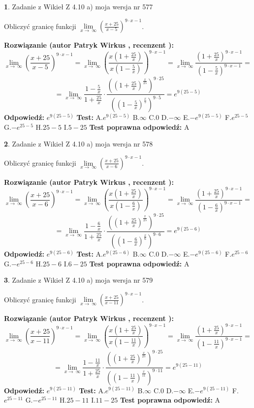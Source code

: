 \documentclass[12pt, a4paper]{article}
\theoremstyle{definition} %
\newtheorem{zad}{}
\newcommand{\zadStart}[1]{\begin{zad}#1\newline}
\newcommand{\zadStop}{\end{zad}}
\newcommand{\rozwStart}[2]{\noindent \textbf{Rozwiązanie (autor #1 , recenzent #2): }\newline}
\newcommand{\rozwStop}{\newline}
\newcommand{\odpStart}{\noindent \textbf{Odpowiedź:}\newline}
\newcommand{\odpStop}{\newline}
\newcommand{\testStart}{\noindent \textbf{Test:}\newline}
\newcommand{\testStop}{\newline}
\newcommand{\kluczStart}{\noindent \textbf{Test poprawna odpowiedź:}\newline}
\newcommand{\kluczStop}{\newline}
\begin{document}
\zadStart{Zadanie z Wikieł Z 4.10 a) moja wersja nr 577}


Obliczyć granicę funkcji  $\lim\limits_{x\to\ \infty}(\frac{x+25}{x-5})^{9\cdot x-1}$.
\zadStop
\rozwStart{Patryk Wirkus}{}
$$\lim\limits_{x\to\ \infty}(\frac{x+25}{x-5})^{9\cdot x-1} = \lim\limits_{x\to\ \infty}(\frac{x(1+\frac{25}{x})}{x(1-\frac{5}{x})})^{9\cdot x-1}=\lim\limits_{x\to\ \infty}\frac{(1+\frac{25}{x})^{9\cdot x-1}}{(1-\frac{5}{x})^{9\cdot x-1}}=$$
$$=\lim\limits_{x\to\ \infty}\frac{1-\frac{5}{x}}{1+\frac{25}{x}}\cdot\frac{((1+\frac{25}{x})^{\frac{x}{25}})^{9\cdot25}}{((1-\frac{5}{x})^{\frac{x}{5}})^{9\cdot5}}=e^{9(25-5)}$$
\rozwStop
\odpStart
$e^{9(25-5)}$
\odpStop
\testStart
A.$e^{9(25-5)}$ B.$\infty$ C.$0$ D.$-\infty$ E.$-e^{9(25-5)}$
F.$e^{25-5}$ G.$-e^{25-5}$
H.$25-5$
I.$5-25$
\testStop
\kluczStart
A
\kluczStop



\zadStart{Zadanie z Wikieł Z 4.10 a) moja wersja nr 578}


Obliczyć granicę funkcji  $\lim\limits_{x\to\ \infty}(\frac{x+25}{x-6})^{9\cdot x-1}$.
\zadStop
\rozwStart{Patryk Wirkus}{}
$$\lim\limits_{x\to\ \infty}(\frac{x+25}{x-6})^{9\cdot x-1} = \lim\limits_{x\to\ \infty}(\frac{x(1+\frac{25}{x})}{x(1-\frac{6}{x})})^{9\cdot x-1}=\lim\limits_{x\to\ \infty}\frac{(1+\frac{25}{x})^{9\cdot x-1}}{(1-\frac{6}{x})^{9\cdot x-1}}=$$
$$=\lim\limits_{x\to\ \infty}\frac{1-\frac{6}{x}}{1+\frac{25}{x}}\cdot\frac{((1+\frac{25}{x})^{\frac{x}{25}})^{9\cdot25}}{((1-\frac{6}{x})^{\frac{x}{6}})^{9\cdot6}}=e^{9(25-6)}$$
\rozwStop
\odpStart
$e^{9(25-6)}$
\odpStop
\testStart
A.$e^{9(25-6)}$ B.$\infty$ C.$0$ D.$-\infty$ E.$-e^{9(25-6)}$
F.$e^{25-6}$ G.$-e^{25-6}$
H.$25-6$
I.$6-25$
\testStop
\kluczStart
A
\kluczStop



\zadStart{Zadanie z Wikieł Z 4.10 a) moja wersja nr 579}


Obliczyć granicę funkcji  $\lim\limits_{x\to\ \infty}(\frac{x+25}{x-11})^{9\cdot x-1}$.
\zadStop
\rozwStart{Patryk Wirkus}{}
$$\lim\limits_{x\to\ \infty}(\frac{x+25}{x-11})^{9\cdot x-1} = \lim\limits_{x\to\ \infty}(\frac{x(1+\frac{25}{x})}{x(1-\frac{11}{x})})^{9\cdot x-1}=\lim\limits_{x\to\ \infty}\frac{(1+\frac{25}{x})^{9\cdot x-1}}{(1-\frac{11}{x})^{9\cdot x-1}}=$$
$$=\lim\limits_{x\to\ \infty}\frac{1-\frac{11}{x}}{1+\frac{25}{x}}\cdot\frac{((1+\frac{25}{x})^{\frac{x}{25}})^{9\cdot25}}{((1-\frac{11}{x})^{\frac{x}{11}})^{9\cdot11}}=e^{9(25-11)}$$
\rozwStop
\odpStart
$e^{9(25-11)}$
\odpStop
\testStart
A.$e^{9(25-11)}$ B.$\infty$ C.$0$ D.$-\infty$ E.$-e^{9(25-11)}$
F.$e^{25-11}$ G.$-e^{25-11}$
H.$25-11$
I.$11-25$
\testStop
\kluczStart
A
\kluczStop
\end{document}
